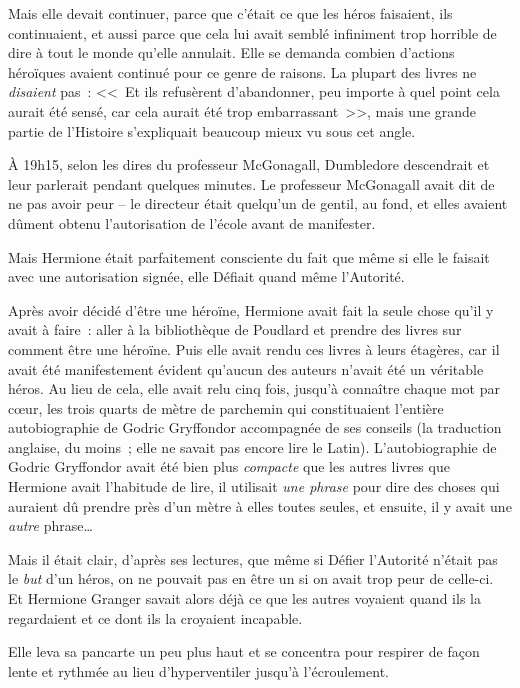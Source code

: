Mais elle devait continuer, parce que c'était ce que les héros faisaient, ils continuaient, et aussi parce que cela lui avait semblé infiniment trop horrible de dire à tout le monde qu'elle annulait. Elle se demanda combien d'actions héroïques avaient continué pour ce genre de raisons. La plupart des livres ne \emph{disaient} pas~: <<~Et ils refusèrent d'abandonner, peu importe à quel point cela aurait été sensé, car cela aurait été trop embarrassant~>>, mais une grande partie de l'Histoire s'expliquait beaucoup mieux vu sous cet angle.

À 19h15, selon les dires du professeur McGonagall, Dumbledore descendrait et leur parlerait pendant quelques minutes. Le professeur McGonagall avait dit de ne pas avoir peur -- le directeur était quelqu'un de gentil, au fond, et elles avaient dûment obtenu l'autorisation de l'école avant de manifester.

Mais Hermione était parfaitement consciente du fait que même si elle le faisait avec une autorisation signée, elle Défiait quand même l'Autorité.

Après avoir décidé d'être une héroïne, Hermione avait fait la seule chose qu'il y avait à faire~: aller à la bibliothèque de Poudlard et prendre des livres sur comment être une héroïne. Puis elle avait rendu ces livres à leurs étagères, car il avait été manifestement évident qu'aucun des auteurs n'avait été un véritable héros. Au lieu de cela, elle avait relu cinq fois, jusqu'à connaître chaque mot par cœur, les trois quarts de mètre de parchemin qui constituaient l'entière autobiographie de Godric Gryffondor accompagnée de ses conseils (la traduction anglaise, du moins~; elle ne savait pas encore lire le Latin). L'autobiographie de Godric Gryffondor avait été bien plus \emph{compacte} que les autres livres que Hermione avait l'habitude de lire, il utilisait \emph{une phrase} pour dire des choses qui auraient dû prendre près d'un mètre à elles toutes seules, et ensuite, il y avait une \emph{autre} phrase…

Mais il était clair, d'après ses lectures, que même si Défier l'Autorité n'était pas le \emph{but} d'un héros, on ne pouvait pas en être un si on avait trop peur de celle-ci. Et Hermione Granger savait alors déjà ce que les autres voyaient quand ils la regardaient et ce dont ils la croyaient incapable.

Elle leva sa pancarte un peu plus haut et se concentra pour respirer de façon lente et rythmée au lieu d'hyperventiler jusqu'à l'écroulement.

